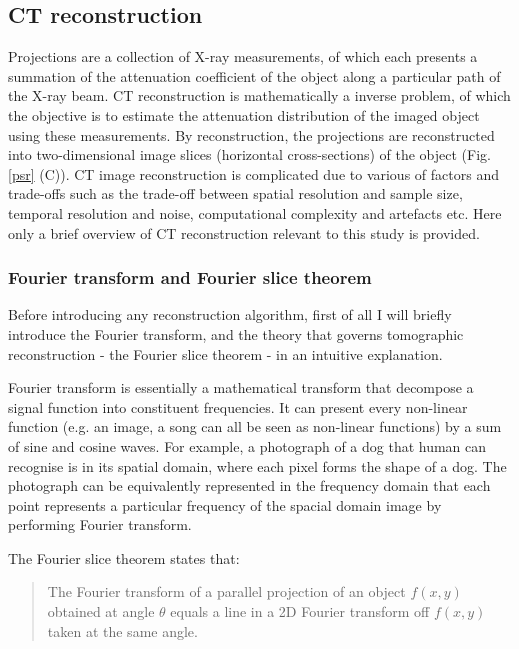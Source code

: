 \subsection{CT reconstruction}
Projections are a collection of X-ray measurements, of which each presents a summation of the attenuation coefficient of the object along a particular path of the X-ray beam. CT reconstruction is mathematically a inverse problem, of which the objective is to estimate the attenuation distribution of the imaged object using these measurements. By reconstruction, the projections are reconstructed into two-dimensional image slices (horizontal cross-sections) of the object (Fig.\ref{psr} (C)). CT image reconstruction is complicated due to various of factors and trade-offs such as the trade-off between spatial resolution and sample size, temporal resolution and noise, computational complexity and artefacts etc. Here only a brief overview of CT reconstruction relevant to this study is provided.

\subsubsection{Fourier transform and Fourier slice theorem}

Before introducing any reconstruction algorithm, first of all I will briefly introduce the Fourier transform, and the theory that governs tomographic reconstruction - the Fourier slice theorem \citep{kak2001principles} - in an intuitive explanation. 

Fourier transform is essentially a mathematical transform that decompose a signal function into constituent frequencies. It can present every non-linear function (e.g. an image, a song can all be seen as non-linear functions) by a sum of sine and cosine waves. For example, a photograph of a dog that human can recognise is in its spatial domain, where each pixel forms the shape of a dog. The photograph can be equivalently represented in the frequency domain that each point represents a particular frequency of the spacial domain image by performing Fourier transform.

The Fourier slice theorem states that: 

\begin{quote}
The Fourier transform of a parallel projection of an object $f(x, y)$ obtained at angle $\theta$ equals a line in a 2D Fourier transform off $f(x, y)$ taken at the same angle.
\end{quote}

